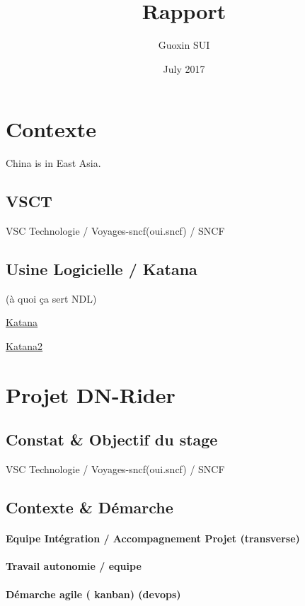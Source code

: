 \documentclass{article}
\title{Rapport}
\author{Guoxin SUI }
\date{July 2017}
\begin{document}
\tableofcontents

\maketitle



\section{Contexte} China is in East Asia.
\subsection{VSCT} VSC Technologie / Voyages-sncf(oui.sncf) / SNCF
\subsection{Usine Logicielle / Katana} (à quoi ça sert NDL)

\href{https://wiki.vsct.fr/display/KTN/KATANA+Accueil}{Katana}

\href{https://wiki.vsct.fr/pages/viewpage.action?spaceKey=KTN\&title=Usine+Logicielle+VSCT}{Katana2}

\section{Projet DN-Rider}
\subsection{Constat \& Objectif du stage} VSC Technologie / Voyages-sncf(oui.sncf) / SNCF

\subsection{Contexte \& Démarche}
\paragraph{Equipe Intégration / Accompagnement Projet (transverse)}
\paragraph{Travail autonomie / equipe}
\paragraph{Démarche agile ( kanban) (devops)}
\end{document}
